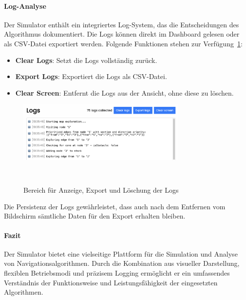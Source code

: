 \documentclass[main.tex]{subfiles} %
\begin{document}
\paragraph{Log-Analyse}

Der Simulator enthält ein integriertes Log-System, das die Entscheidungen des Algorithmus dokumentiert. Die Logs können direkt im Dashboard gelesen oder als CSV-Datei exportiert werden. Folgende Funktionen stehen zur Verfügung~\ref{fig:DashboardLogs}:

\begin{itemize}
    \item \textbf{Clear Logs}:  
    Setzt die Logs vollständig zurück.

    \item \textbf{Export Logs}:  
    Exportiert die Logs als CSV-Datei.

    \item \textbf{Clear Screen}:  
    Entfernt die Logs aus der Ansicht, ohne diese zu löschen.
\end{itemize}

\begin{figure}[H]
    \centering
    \includegraphics[width=0.75\textwidth]{./fig_Simulation/SimulatorLogs.png}
    \caption{Bereich für Anzeige, Export und Löschung der Logs}~\label{fig:DashboardLogs}
\end{figure}

Die Persistenz der Logs gewährleistet, dass auch nach dem Entfernen vom Bildschirm sämtliche Daten für den Export erhalten bleiben.

\paragraph{Fazit}

Der Simulator bietet eine vielseitige Plattform für die Simulation und Analyse von Navigationsalgorithmen. Durch die Kombination aus visueller Darstellung, flexiblen Betriebsmodi und präzisem Logging ermöglicht er ein umfassendes Verständnis der Funktionsweise und Leistungsfähigkeit der eingesetzten Algorithmen.
\end{document}
